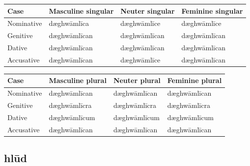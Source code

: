 \par\begingroup
\fontsize{10.5}{13.2}\selectfont
\setlength{\LTleft}{0pt}\setlength{\LTright}{\fill}
\noindent
\begin{tabular}{@{}>{\raggedright\arraybackslash}p{22.0mm}>{\raggedright\arraybackslash}p{31.188mm}>{\raggedright\arraybackslash}p{31.188mm}>{\raggedright\arraybackslash}p{31.188mm}@{}}
\toprule
\textbf{Case} & \textbf{Masculine singular} & \textbf{Neuter singular} & \textbf{Feminine singular} \\
\midrule
Nominative & dæghwāmlīca & dæghwāmlīce & dæghwāmlīce \\
Genitive & dæghwāmlīcan & dæghwāmlīcan & dæghwāmlīcan \\
Dative & dæghwāmlīcan & dæghwāmlīcan & dæghwāmlīcan \\
Accusative & dæghwāmlīcan & dæghwāmlīce & dæghwāmlīcan \\
\bottomrule
\end{tabular}
\par\endgroup
\par\addvspace{5pt}
\par\begingroup
\fontsize{10.5}{13.2}\selectfont
\setlength{\LTleft}{0pt}\setlength{\LTright}{\fill}
\noindent
\begin{tabular}{@{}>{\raggedright\arraybackslash}p{22.0mm}>{\raggedright\arraybackslash}p{31.188mm}>{\raggedright\arraybackslash}p{31.188mm}>{\raggedright\arraybackslash}p{31.188mm}@{}}
\toprule
\textbf{Case} & \textbf{Masculine plural} & \textbf{Neuter plural} & \textbf{Feminine plural} \\
\midrule
Nominative & dæghwāmlīcan & dæghwāmlīcan & dæghwāmlīcan \\
Genitive & dæghwāmlīcra & dæghwāmlīcra & dæghwāmlīcra \\
Dative & dæghwāmlīcum & dæghwāmlīcum & dæghwāmlīcum \\
Accusative & dæghwāmlīcan & dæghwāmlīcan & dæghwāmlīcan \\
\bottomrule
\end{tabular}
\par\endgroup

\subsection*{hlūd}

